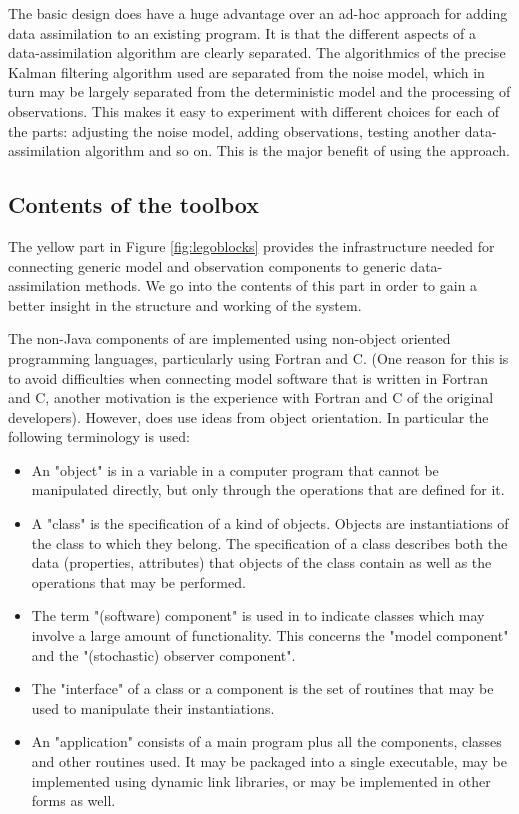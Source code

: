 The basic design does have a huge advantage over an ad-hoc approach for adding data assimilation to an existing program. It is that the different aspects of a data-assimilation algorithm are clearly separated. The algorithmics of the precise Kalman filtering algorithm used are separated from the noise model, which in turn may be largely separated from the deterministic model and the processing of observations. This makes it easy to experiment with different choices for each of the parts: adjusting the noise model, adding observations, testing another data-assimilation algorithm and so on. This is the major benefit of using the \oda approach.

\subsection{Contents of the \oda toolbox}

The yellow part in Figure \ref{fig:legoblocks} provides the infrastructure needed for connecting generic model and observation components to generic data-assimilation methods. We go into the contents of this part in order to gain a better insight in the structure and working of the \oda system.

The non-Java components of \oda are implemented using non-object oriented programming languages, particularly using Fortran and C. (One reason for this is to avoid difficulties when connecting model software that is written in Fortran and C, another motivation is the experience with Fortran and C of the original developers). However, \oda does use ideas from object orientation. In particular the following terminology is used:

\begin{itemize}
	\item An "object" is in \oda a variable in a computer program that cannot be manipulated directly, but only through the operations that are defined for it. 
	\item A "class" is the specification of a kind of objects. Objects are instantiations of the class to which they belong. The specification of a class describes both the data (properties, attributes) that objects of the class contain as well as the operations that may be performed. 
	\item The term "(software) component" is used in \oda to indicate classes which may involve a large amount of functionality. This concerns the "\oda model component" and the "\oda (stochastic) observer component". 
	\item The "interface" of a class or a component is the set of routines that may be used to manipulate their instantiations. 
	\item An "\oda application" consists of a main program plus all the components, classes and other routines used. It may be packaged into a single executable, may be implemented using dynamic link libraries, or may be implemented in other forms as well. 
\end{itemize}

